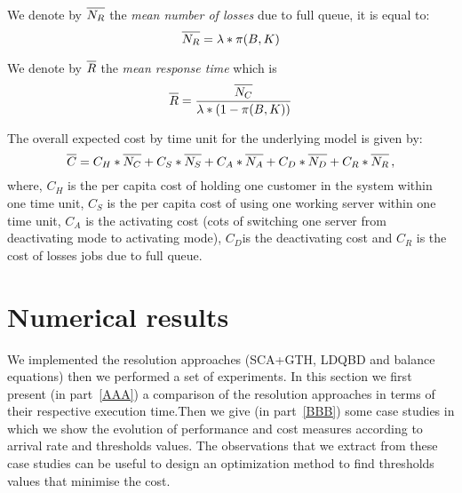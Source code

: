\documentclass[conference]{IEEEtran}
\begin{document}
We denote by $\overline{\mathstrut N_{R}}$ the \emph{mean number of losses} due to full queue, it is equal to:
\begin{equation}
    \overline{\mathstrut N_{R}}=\lambda*\pi(B,K)
\end{equation}

We denote by $\overline{\mathstrut R}$ the \emph{mean response time} which is
\begin{equation}
    \label{formule:tempsreponse}
    \overline{\mathstrut R}=\frac{\overline{\mathstrut N_{C}}}{\lambda*(1-\pi(B,K))}
\end{equation}

The overall expected cost by time unit for the underlying model is given by:
\begin{equation}
    \label{formule:cost}
    \overline{\mathstrut C}=C_{H}*\overline{\mathstrut N_{C}}+C_{S}*\overline{\mathstrut N_{S}}+C_{A}*\overline{\mathstrut N_{A}}+C_{D}*\overline{\mathstrut N_{D}}+C_{R}*\overline{\mathstrut N_{R}} \, ,
\end{equation}
where, $C_{H}$ is the per capita cost of holding one customer in the system within one time unit,
$C_{S}$ is the per capita cost of using one working server within one time unit,
 $C_{A}$ is the activating cost (cots of switching one server from deactivating mode to activating mode),
 $C_{D}$is the deactivating cost  and   $C_{R}$ is the cost of losses jobs due to full queue.

\section{Numerical results}\label{sec:ResNum}
We implemented the resolution approaches (SCA+GTH, LDQBD and balance equations) then we performed a set of experiments. In this section we first 
present (in part~\ref{AAA}) a comparison of the resolution approaches in terms of their respective execution time.Then we give (in part~\ref{BBB}) some case studies in which we show the evolution of performance and cost measures according to arrival rate and thresholds values. The observations that we extract from these case studies can be useful to design an optimization method to find thresholds values that minimise the cost.
\end{document}
